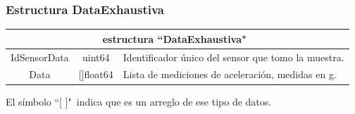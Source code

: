 \documentclass{beamer}
\begin{document}
\begin{frame}
    \frametitle{Estructura DataExhaustiva}
    \begin{table}[ht]
        \begin{center}
            \begin{tabular}{|c|c|p{6cm}|}
                \hline
                \multicolumn{3}{|c|}{estructura  ``DataExhaustiva"\ }\\\hline\hline
                IdSensorData & uint64 & Identificador único del sensor que tomo la muestra.\\\hline
                Data  & []float64 &Lista de mediciones de aceleración, medidas en g.\\\hline
            \end{tabular}

            \vspace{0.5cm}
            El símbolo ``[  ]"\  indica que es un arreglo de ese tipo de datos.
        \end{center}
    \end{table}
\end{frame}
\end{document}

